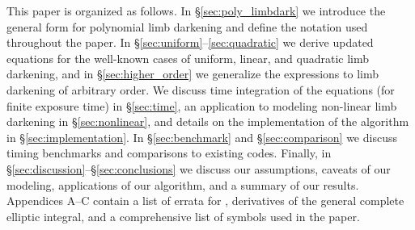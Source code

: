 \documentclass[modern,trackchanges]{aastex63}
\begin{document}


This paper is organized as follows. In \S\ref{sec:poly_limbdark}
we introduce the general form for polynomial limb darkening
and define the notation used throughout the paper. In \S\ref{sec:uniform}--\ref{sec:quadratic}
we derive updated equations for the well-known cases of uniform, linear, and
quadratic limb darkening, and in \S\ref{sec:higher_order} we generalize the
expressions to limb darkening of arbitrary order.
%
We discuss time integration of the equations (for finite exposure time)
in \S\ref{sec:time}, an application to modeling non-linear limb
darkening in \S\ref{sec:nonlinear}, and details on the implementation
of the algorithm in \S\ref{sec:implementation}. In \S\ref{sec:benchmark} and
\S\ref{sec:comparison} we discuss timing benchmarks and comparisons to
existing codes. Finally, in \S\ref{sec:discussion}--\S\ref{sec:conclusions}
we discuss our assumptions, caveats of our modeling, applications of our
algorithm, and a summary of our results. Appendices A--C contain a list
of errata for \citet{MandelAgol2002}, derivatives of the general
complete elliptic integral, and a comprehensive list of symbols used in
the paper.
\end{document}
